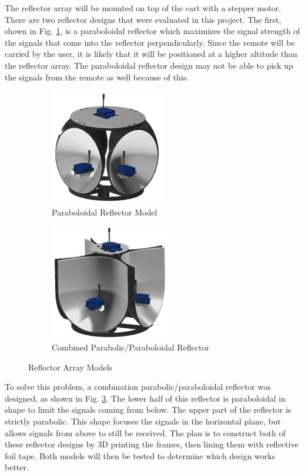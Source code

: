 \vspace*{12pt}
\noindent
The reflector array will be mounted on top of the cart with a stepper motor.
There are two reflector designs that were evaluated in this project. The first,
shown in Fig. \ref{fig:parabolodialReflector}, is a paraboloidal reflector which
maximizes the signal strength of the signals that come into the reflector
perpendicularly. Since the remote will be carried by the user, it is likely that
it will be positioned at a higher altitude than the reflector array. The
paraboloidal reflector design may not be able to pick up the signals from the
remote as well because of this. %
%
%
\begin{figure}[H]
  \centering
  \begin{subfigure}[t]{0.5\textwidth}
    \centering
    \includegraphics[height=2in]{figs/img/paraboloidalReflector}
    \captionsetup{width=\textwidth, justification=raggedright}
    \caption{Paraboloidal Reflector Model}
    \label{fig:parabolodialReflector}
  \end{subfigure}
  \begin{subfigure}[t]{0.4\textwidth}
    \centering
    \includegraphics[height=2in]{figs/img/parabolicReflector}
    \captionsetup{width=\textwidth, justification=raggedright}
    \caption{Combined Parabolic/Paraboloidal Reflector}
    \label{fig:parabolicReflector1}
  \end{subfigure}
  \caption{Reflector Array Models}
\end{figure}
%
To solve this problem, a combination parabolic/paraboloidal reflector was
designed, as shown in Fig. \ref{fig:parabolicReflector1}. The lower half of this
reflector is paraboloidal in shape to limit the signals coming from below. The
upper part of the reflector is strictly parabolic. This shape focuses the
signals in the horizontal plane, but allows signals from above to still be
received. The plan is to construct both of these reflector designs by 3D
printing the frames, then lining them with reflective foil tape. Both models
will then be tested to determine which design works better.


